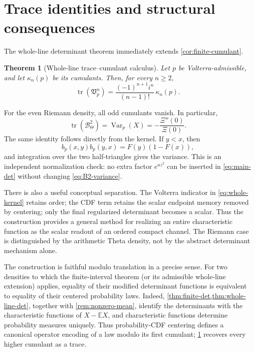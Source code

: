 \documentclass[11pt,reqno]{amsart}
\numberwithin{equation}{section}
\newtheorem{theorem}{Theorem}[section]
\newcommand{\1}{\mathbf 1}
\newcommand{\BTheta}{\mathcal B_{\Theta}}
\newcommand{\Vp}{\mathfrak V_p}
\newcommand{\tr}{\operatorname{tr}}
\begin{document}
\section{Trace identities and structural consequences}

The whole-line determinant theorem immediately extends
\cref{cor:finite-cumulant}.

\begin{theorem}[Whole-line trace--cumulant calculus]\label{thm:cumulants}
Let $p$ be Volterra-admissible, and let $\kappa_n(p)$ be its cumulants.  Then,
for every $n\geq2$,
\begin{equation}\label{eq:whole-cumulants}
 \boxed{
 \tr(\Vp^n)=
 \frac{(-1)^{n+1}i^n}{(n-1)!}\,\kappa_n(p).}
\end{equation}
\end{theorem}

For the even Riemann density, all odd cumulants vanish.  In particular,
\begin{equation}\label{eq:B2-variance}
 \tr(\BTheta^2)
 =\operatorname{Var}_p(X)
 =-\frac{\Xi''(0)}{\Xi(0)}.
\end{equation}
The same identity follows directly from the kernel.  If $y<x$, then
\[
 b_p(x,y)b_p(y,x)=F(y)(1-F(x)),
\]
and integration over the two half-triangles gives the variance.  This is an
independent normalization check: no extra factor $e^{az^2}$ can be inserted
in \eqref{eq:main-det} without changing \eqref{eq:B2-variance}.

There is also a useful conceptual separation.  The Volterra indicator in
\eqref{eq:whole-kernel} retains order; the CDF term retains the scalar endpoint
memory removed by centering; only the final regularized determinant becomes a
scalar.  Thus the construction provides a general method for realizing an
entire characteristic function as the scalar readout of an ordered compact
channel.  The Riemann case is distinguished by the arithmetic Theta density,
not by the abstract determinant mechanism alone.

The construction is faithful modulo translation in a precise sense.  For two
densities to which the finite-interval theorem (or its admissible whole-line
extension) applies, equality of their modified determinant functions is
equivalent to equality of their centered probability laws.  Indeed,
\cref{thm:finite-det,thm:whole-line-det}, together with
\cref{rem:nonzero-mean}, identify the determinants with the characteristic
functions of $X-\mathbb E X$, and characteristic functions determine
probability measures uniquely.  Thus probability-CDF centering
defines a canonical operator encoding of a law modulo its first cumulant;
\cref{thm:cumulants} recovers every higher cumulant as a trace.
\end{document}
